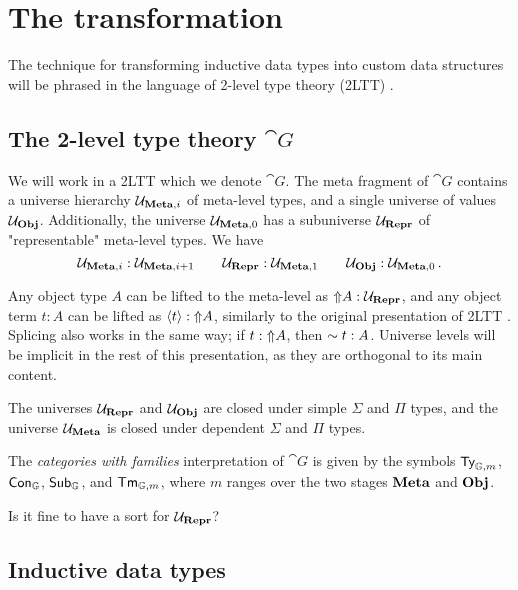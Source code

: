 \section{The transformation}\label{sec:prelim}

The technique for transforming inductive data types into custom data structures
will be phrased in the language of 2-level type theory (2LTT)
\cite{Kovacs2022-vb}. 

\subsection{The 2-level type theory $\cat{G}$}

We will work in a 2LTT which we denote $\cat{G}$. The meta fragment of
$\cat{G}$ contains a universe hierarchy ${\mathcal{U}_{{\textbf{Meta},i}}}$ of meta-level
types, and a single universe of values ${{\mathcal{U}_{{\textbf{Obj}}}}}$. Additionally, the universe
${\mathcal{U}_{{\textbf{Meta},0}}}$ has a subuniverse ${{\mathcal{U}_{{\textbf{Repr}}}}}$ of "representable" meta-level
types. We have
\[
  {\mathcal{U}_{{\textbf{Meta},i}}} : {\mathcal{U}_{{\textbf{Meta},i+1}}} \qquad {{\mathcal{U}_{{\textbf{Repr}}}}} : {\mathcal{U}_{{\textbf{Meta},1}}} \qquad {{\mathcal{U}_{{\textbf{Obj}}}}} : {\mathcal{U}_{{\textbf{Meta},0}}} \,.
\]

Any object type $A$ can be lifted to the meta-level as $\text{$\Uparrow$}{A} : {{\mathcal{U}_{{\textbf{Repr}}}}}$, and any
object term $t : A$ can be lifted as $\langle{t}\rangle : \text{$\Uparrow$}{A}$, similarly to the
original presentation of 2LTT \cite{Kovacs2022-vb}. Splicing also works in the
same way; if $t : \text{$\Uparrow$}{A}$, then $\text{$\sim{t}$} : A$. Universe levels will be
implicit in the rest of this presentation, as they are orthogonal to its main
content. 

The universes ${{\mathcal{U}_{{\textbf{Repr}}}}}$ and ${{\mathcal{U}_{{\textbf{Obj}}}}}$ are closed under simple $\Sigma$ and $\Pi$ types,
and the universe ${{\mathcal{U}_{{\textbf{Meta}}}}}$ is closed under dependent $\Sigma$ and $\Pi$ types.

The \emph{categories with families} interpretation of $\cat{G}$ is given by the
symbols ${\textsf{Ty}}_{\mathbb{G},m}$, ${\textsf{Con}}_{\mathbb{G}}$, ${\textsf{Sub}}_{\mathbb{G}}$, and
${\textsf{Tm}}_{\mathbb{G},m}$, where $m$ ranges over the two stages $\textbf{Meta}$ and
$\textbf{Obj}$.

Is it fine to have a sort for ${{\mathcal{U}_{{\textbf{Repr}}}}}$?

\subsection{Inductive data types}


